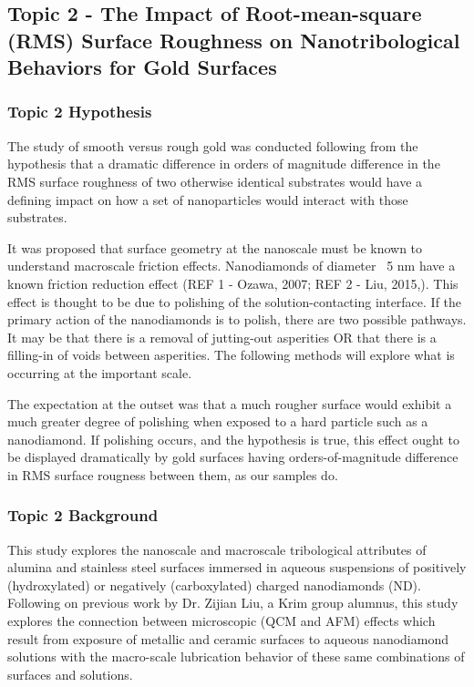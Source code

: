 \subsection{Topic 2 - The Impact of Root-mean-square (RMS) Surface Roughness on Nanotribological Behaviors for Gold Surfaces}


\subsubsection{Topic 2 Hypothesis}

The study of smooth versus rough gold was conducted following from the hypothesis that a dramatic difference in orders of magnitude difference in the RMS surface roughness of two otherwise identical substrates would have a defining impact on how a set of nanoparticles would interact with those substrates. 

It was proposed that surface geometry at the nanoscale must be known to understand macroscale friction effects.  Nanodiamonds of diameter ~5 nm have a known friction reduction effect (REF 1 - Ozawa, 2007; REF 2 - Liu, 2015,). This effect is thought to be due to polishing of the solution-contacting interface. If the primary action of the nanodiamonds is to polish, there are two possible pathways. It may be that there is a removal of jutting-out asperities OR that there is a filling-in of voids between asperities. The following methods will explore what is occurring at the important scale.

The expectation  at the outset was that a much rougher surface would exhibit a much greater degree of polishing when exposed to a hard particle such as a nanodiamond. If polishing occurs, and the hypothesis is true, this effect ought to be displayed dramatically by gold surfaces having orders-of-magnitude difference in RMS surface rougness between them, as our samples do.



\subsubsection{Topic 2 Background}

This study explores the nanoscale and macroscale tribological attributes of alumina and stainless steel surfaces immersed in aqueous suspensions of positively (hydroxylated) or negatively (carboxylated) charged nanodiamonds (ND). Following on previous work by Dr. Zijian Liu, a Krim group alumnus, this study explores the connection between microscopic (QCM and AFM) effects which result from exposure of metallic and ceramic surfaces to aqueous nanodiamond solutions with the macro-scale lubrication behavior of these same combinations of surfaces and solutions.


